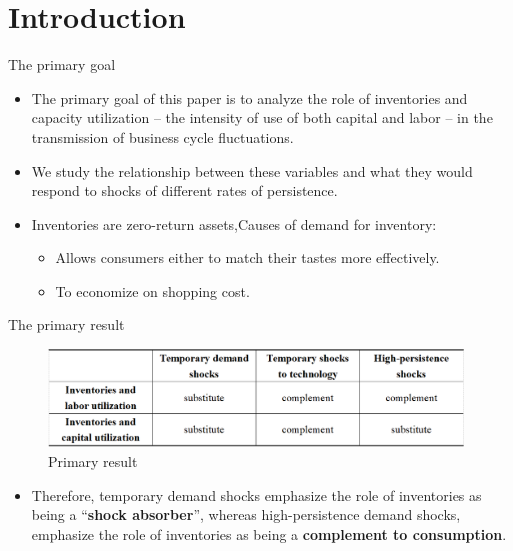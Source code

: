 \documentclass[fontset=windows,12pt,t,aspectratio=169]{beamer}
\begin{document}
\section{Introduction}
\begin{frame}{The primary goal}
 \begin{itemize}
   \item The primary goal of this paper is to analyze the role of inventories and capacity utilization – the intensity of use of both capital and labor – in the transmission of business cycle fluctuations.
   \vspace{5pt}
   \item We study the relationship between these variables and what they would respond to shocks of different rates of persistence.
   \vspace{5pt}
     \item Inventories are zero-return assets,Causes of demand for inventory:
     \vspace{5pt}
      \begin{itemize}
        \item Allows consumers either to match their tastes more effectively.
        \vspace{5pt}
        \item To economize on shopping cost.
      \end{itemize}
 \end{itemize}
\end{frame}

\begin{frame}{The primary result}
    \begin{figure}
         \begin{center}
         \caption*{Primary result}
         \includegraphics[width=11cm]{table/result.png}
         \end{center}
    \end{figure}
   \begin{itemize}

     \item Therefore, temporary demand shocks emphasize the role of inventories as being a “\textbf{shock absorber}”, whereas high-persistence demand shocks, emphasize the role of inventories as being a \textbf{complement to consumption}.
   \end{itemize}
\end{frame}
\end{document}
